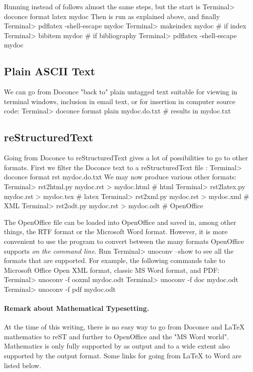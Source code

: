 \documentclass{book}
\begin{document}
{{{Running  instead of  follows almost the same steps,
but the start is
\bsys
Terminal> doconce format latex mydoc
\esys
Then  is run as explained above, and finally
\bsys
Terminal> pdflatex -shell-escape mydoc
Terminal> makeindex mydoc   # if index
Terminal> bibitem mydoc     # if bibliography
Terminal> pdflatex -shell-escape mydoc
\esys

\subsection{Plain ASCII Text}

We can go from Doconce "back to" plain untagged text suitable for viewing
in terminal windows, inclusion in email text, or for insertion in
computer source code:
\bsys
Terminal> doconce format plain mydoc.do.txt  # results in mydoc.txt
\esys

\subsection{reStructuredText}

Going from Doconce to reStructuredText gives a lot of possibilities to
go to other formats. First we filter the Doconce text to a
reStructuredText file :
\bsys
Terminal> doconce format rst mydoc.do.txt
\esys
We may now produce various other formats:
\bsys
Terminal> rst2html.py  mydoc.rst > mydoc.html # html
Terminal> rst2latex.py mydoc.rst > mydoc.tex  # latex
Terminal> rst2xml.py   mydoc.rst > mydoc.xml  # XML
Terminal> rst2odt.py   mydoc.rst > mydoc.odt  # OpenOffice
\esys

The OpenOffice file  can be loaded into OpenOffice and
saved in, among other things, the RTF format or the Microsoft Word format.
However, it is more convenient to use the program 
to convert between the many formats OpenOffice supports \emph{on the command line}.
Run
\bsys
Terminal> unoconv --show
\esys
to see all the formats that are supported.
For example, the following commands take
 to Microsoft Office Open XML format,
classic MS Word format, and PDF:
\bsys
Terminal> unoconv -f ooxml mydoc.odt
Terminal> unoconv -f doc mydoc.odt
Terminal> unoconv -f pdf mydoc.odt
\esys

\paragraph{Remark about Mathematical Typesetting.}
At the time of this writing, there is no easy way to go from Doconce
and {\LaTeX} mathematics to reST and further to OpenOffice and the
"MS Word world". Mathematics is only fully supported by  as
output and to a wide extent also supported by the  output format.
Some links for going from {\LaTeX} to Word are listed below.

}}}
\end{document}
